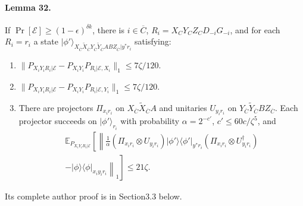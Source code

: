 \documentclass[10pt,a4paper]{article}
\providecommand{\ket}[1]{\lvert#1\rangle}
\providecommand{\bra}[1]{\langle#1\rvert}
\providecommand{\proj}[1]{\ket{#1}\bra{#1}}
\begin{document}
\paragraph{Lemma 32.} If $\Pr[\mathcal E]\ge(1-\epsilon)^{\delta k}$, there is $i\in\overline C$, $R_i=X_CY_CZ_CD_{-i}G_{-i}$, and for each $R_i=r_i$ a state $\ket{\phi'}_{X_{\overline C}\widetilde X_{\overline C}Y_{\overline C}\widetilde Y_{\overline C}ABZ_{\overline C}|y^*r_i}$ satisfying:
\begin{enumerate}\item[(i)] $\|P_{X_iY_iR_i|\mathcal E}-P_{X_iY_i}P_{R_i|\mathcal E,X_i}\|_1\le7\zeta/120$.
\item[(ii)] $\|P_{X_iY_iR_i|\mathcal E}-P_{X_iY_i}P_{R_i|\mathcal E,Y_i}\|_1\le7\zeta/120$.
\item[(iii)] There are projectors $\Pi_{x_ir_i}$ on $X_{\overline C}\widetilde X_{\overline C}A$ and unitaries $U_{y_ir_i}$ on $Y_{\overline C}\widetilde Y_{\overline C}BZ_{\overline C}$. Each projector succeeds on $\ket{\phi'}_{r_i}$ with probability $\alpha=2^{-c'}$, $c'\le60c/\zeta^5$, and
\begin{multline*}\mathbb E_{P_{X_iY_iR_i|\mathcal E}}\left[\left\|\frac1\alpha(\Pi_{x_ir_i}\otimes U_{y_ir_i})\proj{\phi'}_{y^*r_i}(\Pi_{x_ir_i}\otimes U_{y_ir_i}^\dagger)\right.\right.\\\left.\left.-\proj\phi_{x_iy_ir_i}\right\|_1\right]\le21\zeta.
\end{multline*}\end{enumerate}
Its complete author proof is in Section3.3 below.
\end{document}
